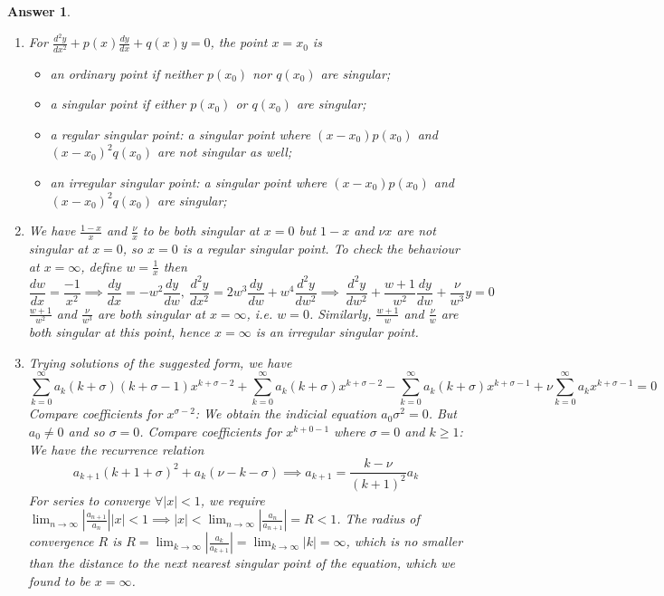 \documentclass[a4paper]{article}
\newtheorem{ans}{Answer}[section]
\theoremstyle{new}
\begin{document}
\begin{ans}\leavevmode
\begin{enumerate}[label=(\alph*)]
\item For $\frac{d^2y}{dx^2}+p(x)\frac{dy}{dx}+q(x)y=0$, the point $x=x_0$ is
\begin{itemize}
    \item an ordinary point if neither $p(x_0)$ nor $q(x_0)$ are singular;
    \item a singular point if either $p(x_0)$ or $q(x_0)$ are singular;
    \item a regular singular point: a singular point where  $(x-x_0)p(x_0)$ and $(x-x_0)^2q(x_0)$ are not singular as well;
    \item an irregular singular point: a singular point where $(x-x_0)p(x_0)$ and $(x-x_0)^2q(x_0)$ are singular;
\end{itemize}
\item We have $\frac{1-x}{x}$ and $\frac{\nu}{x}$ to be both singular at $x=0$ but $1-x$ and $\nu x$ are not singular at $x=0$, so $x=0$ is a regular singular point. To check the behaviour at $x=\infty$, define $w=\frac{1}{x}$ then
$$\frac{dw}{dx}=\frac{-1}{x^2}\implies\frac{dy}{dx}=-w^2\frac{dy}{dw},~\frac{d^2y}{dx^2}=2w^3\frac{dy}{dw}+w^4\frac{d^2y}{dw^2}\implies~\frac{d^2y}{dw^2}+\frac{w+1}{w^2}\frac{dy}{dw}+\frac{\nu}{w^3}y=0$$
$\frac{w+1}{w^2}$ and $\frac{\nu}{w^3}$ are both singular at $x=\infty$, i.e. $w=0$. Similarly, $\frac{w+1}{w}$ and $\frac{\nu}{w}$ are both singular at this point, hence $x=\infty$ is an irregular singular point.
\item Trying solutions of the suggested form, we have
$$\sum_{k=0}^\infty a_k(k+\sigma)(k+\sigma-1)x^{k+\sigma-2}+\sum_{k=0}^\infty a_k(k+\sigma)x^{k+\sigma-2}-\sum_{k=0}^\infty a_k(k+\sigma)x^{k+\sigma-1}+\nu\sum_{k=0}^\infty a_kx^{k+\sigma-1}=0$$
Compare coefficients for $x^{\sigma-2}$: We obtain the indicial equation $a_0\sigma^2=0$. But $a_0\neq0$ and so $\sigma=0$. Compare coefficients for  $x^{k+0-1}$ where $\sigma=0$ and $k\geq1$: We have the recurrence relation
    $$a_{k+1}(k+1+\sigma)^2+a_k(\nu-k-\sigma)\implies a_{k+1}=\frac{k-\nu}{(k+1)^2}a_k$$
For series to converge $\forall|x|<1$, we require $\lim_{n\rightarrow\infty}|\frac{a_{n+1}}{a_n}||x|<1\implies|x|<\lim_{n\rightarrow\infty}|\frac{a_n}{a_{n+1}}|=R<1$. The radius of convergence $R$ is $R=\lim_{k\rightarrow\infty}|\frac{a_k}{a_{k+1}}|=\lim_{k\rightarrow\infty}|k|=\infty$, which is no smaller than the distance to the next nearest singular point of the equation, which we found to be $x=\infty$.

\end{enumerate}
\end{ans}
\end{document}
